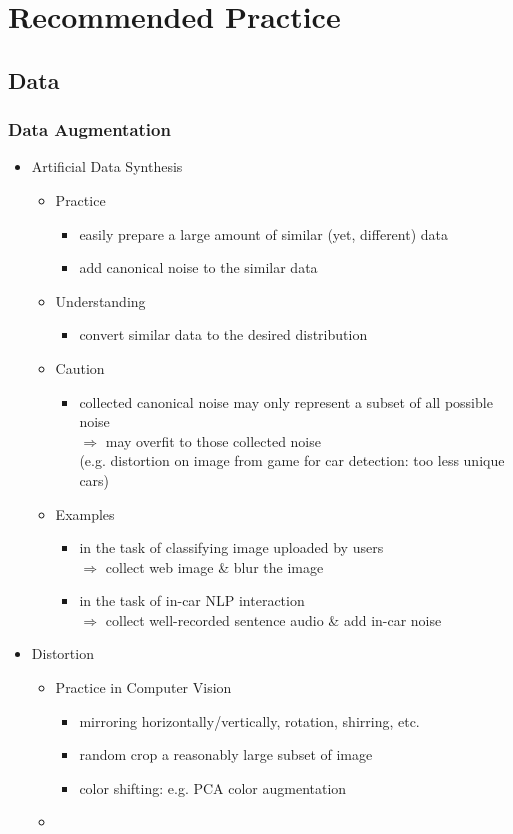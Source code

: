 \section{Recommended Practice}

\subsection{Data}
\subsubsection{Data Augmentation}
\begin{itemize}
\item Artificial Data Synthesis
	\begin{itemize}
	\item Practice
		\begin{itemize}
		\item easily prepare a large amount of similar (yet, different) data
		\item add canonical noise to the similar data
		\end{itemize}
	\item Understanding
		\begin{itemize}
		\item convert similar data to the desired distribution
		\end{itemize}
	\item Caution
		\begin{itemize}
		\item collected canonical noise may only represent a subset of all possible noise \\
		$\Rightarrow$ may overfit to those collected noise \\
		(e.g. distortion on image from game for car detection: too less unique cars)
		\end{itemize}
	\item Examples
		\begin{itemize}
		\item in the task of classifying image uploaded by users \\ 
		$\Rightarrow$ collect web image \& blur the image
		\item in the task of in-car NLP interaction \\
		$\Rightarrow$ collect well-recorded sentence audio \& add in-car noise
		\end{itemize}
	\end{itemize}
	
\item Distortion
	\begin{itemize}
	\item Practice in Computer Vision
		\begin{itemize}
		\item mirroring horizontally/vertically, rotation, shirring, etc.
		\item random crop a reasonably large subset of image
		\item color shifting: e.g. PCA color augmentation
		\end{itemize}
	\item 
	\end{itemize}
\end{itemize}
